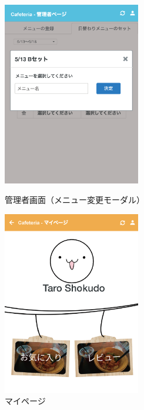 \documentclass[a4paper]{ltjsarticle}
\begin{document}
    \begin{figure}[ht]
        \begin{minipage}[t]{.49\textwidth}
            \center
            \includegraphics[width=60mm]{ui/admin-home-set-menu-modal.png}
            \caption{管理者画面（メニュー変更モーダル）}
            \label{img:admin-home-set-menu-modal}
        \end{minipage}
        \begin{minipage}[t]{.49\textwidth}
            \center
            \includegraphics[width=60mm]{ui/my-page.png}
            \caption{マイページ}
            \label{img:my-page}
        \end{minipage}
    \end{figure}
\end{document}
